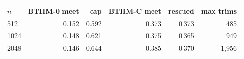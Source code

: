 \begin{tabular}{@{}lrrrrr@{}}
\toprule
$n$ & BTHM-0 meet & cap & BTHM-C meet & rescued & max trims \\
\midrule
512 & 0.152 & 0.592 & 0.373 & 0.373 & 485 \\
1024 & 0.148 & 0.621 & 0.375 & 0.365 & 949 \\
2048 & 0.146 & 0.644 & 0.385 & 0.370 & 1,956 \\
\bottomrule
\end{tabular}
